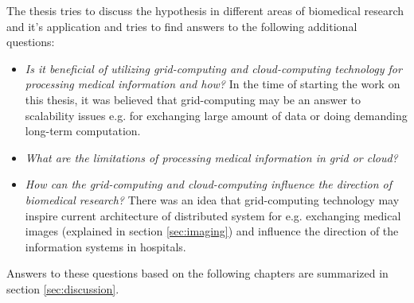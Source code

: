 The thesis tries to discuss the hypothesis in different areas of biomedical research and it's application and tries to find answers to the following additional questions:
\begin{itemize}
\item \emph{Is it beneficial of utilizing grid-computing and cloud-computing technology for processing medical information and how?} In the time of starting the work on this thesis, it was believed that grid-computing may be an answer to scalability issues e.g. for exchanging large amount of data or doing demanding long-term computation. %
\item \emph{What are the limitations of processing medical information in grid or cloud?} 
\item \emph{How can the grid-computing and cloud-computing influence the direction of biomedical research?} There was an idea that grid-computing technology may inspire current architecture of distributed system for e.g. exchanging medical images (explained in section \ref{sec:imaging}) and influence the direction of the information systems in hospitals. 
\end{itemize}

Answers to these questions based on the following chapters are summarized in section \ref{sec:discussion}.

